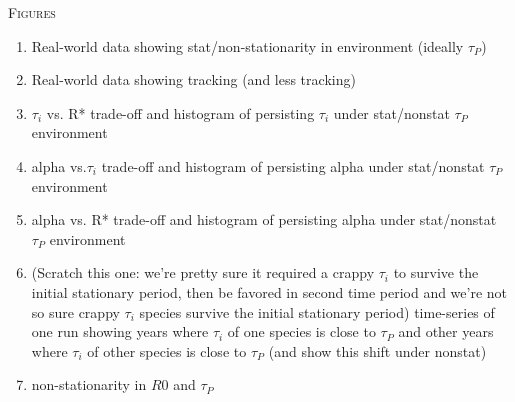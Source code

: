 \documentclass[11pt,letterpaper]{article}
\renewcommand{\section}[1]{%
\bigskip
\begin{center}
\begin{Large}
\normalfont\scshape #1
\medskip
\end{Large}
\end{center}}
\begin{document}
\begin{itemize}
\newpage
\section{Figures}
\begin{enumerate}
\item Real-world data showing stat/non-stationarity in environment (ideally $\tau_{P}$) 
\item Real-world data showing tracking (and less tracking)
\item $\tau_{i}$ vs. R* trade-off and histogram of persisting $\tau_i$ under stat/nonstat $\tau_{P}$ environment
\item alpha vs.$\tau_i$ trade-off and histogram of persisting alpha under stat/nonstat $\tau_{P}$ environment
\item alpha vs. R* trade-off and histogram of persisting alpha under stat/nonstat $\tau_{P}$ environment
\item (Scratch this one: we're pretty sure it required a crappy $\tau_i$ to survive the initial stationary period, then be favored in second time period and we're not so sure crappy $\tau_i$ species survive the initial stationary period) time-series of one run showing years where $\tau_i$ of one species is close to $\tau_{P}$ and other years where $\tau_i$ of other species is close to $\tau_{P}$ (and show this shift under nonstat)
\item non-stationarity in $R0$ and $\tau_{P}$
\end{enumerate}








\newpage





\end{itemize}
\end{document}
